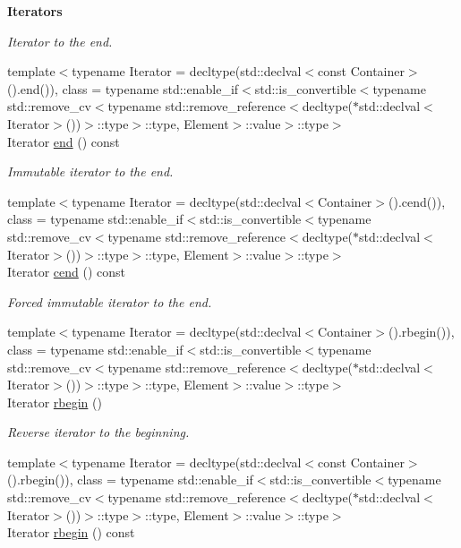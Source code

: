\begin{Indent}{\bf Iterators}
\begin{DoxyCompactItemize}
\begin{DoxyCompactList}\small\item\em Iterator to the end. \end{DoxyCompactList}\item 
{\footnotesize template$<$typename Iterator  = decltype(std\-::declval$<$const Container$>$().\-end()), class  = typename std\-::enable\-\_\-if$<$std\-::is\-\_\-convertible$<$typename std\-::remove\-\_\-cv$<$typename std\-::remove\-\_\-reference$<$decltype($\ast$std\-::declval$<$\-Iterator$>$())$>$\-::type$>$\-::type, Element$>$\-::value$>$\-::type$>$ }\\Iterator \hyperlink{exceptionmagrathea_1_1SimpleHyperOctree_a24c5fa04c7e0d320c952bf1cad21f171}{end} () const 
\begin{DoxyCompactList}\small\item\em Immutable iterator to the end. \end{DoxyCompactList}\item 
{\footnotesize template$<$typename Iterator  = decltype(std\-::declval$<$\-Container$>$().\-cend()), class  = typename std\-::enable\-\_\-if$<$std\-::is\-\_\-convertible$<$typename std\-::remove\-\_\-cv$<$typename std\-::remove\-\_\-reference$<$decltype($\ast$std\-::declval$<$\-Iterator$>$())$>$\-::type$>$\-::type, Element$>$\-::value$>$\-::type$>$ }\\Iterator \hyperlink{exceptionmagrathea_1_1SimpleHyperOctree_ab051bb22f6d7fb70f41cf3e849339794}{cend} () const 
\begin{DoxyCompactList}\small\item\em Forced immutable iterator to the end. \end{DoxyCompactList}\item 
{\footnotesize template$<$typename Iterator  = decltype(std\-::declval$<$\-Container$>$().\-rbegin()), class  = typename std\-::enable\-\_\-if$<$std\-::is\-\_\-convertible$<$typename std\-::remove\-\_\-cv$<$typename std\-::remove\-\_\-reference$<$decltype($\ast$std\-::declval$<$\-Iterator$>$())$>$\-::type$>$\-::type, Element$>$\-::value$>$\-::type$>$ }\\Iterator \hyperlink{exceptionmagrathea_1_1SimpleHyperOctree_ae3fa6fce9d0041e0801cc5a82b0e3d84}{rbegin} ()
\begin{DoxyCompactList}\small\item\em Reverse iterator to the beginning. \end{DoxyCompactList}\item 
{\footnotesize template$<$typename Iterator  = decltype(std\-::declval$<$const Container$>$().\-rbegin()), class  = typename std\-::enable\-\_\-if$<$std\-::is\-\_\-convertible$<$typename std\-::remove\-\_\-cv$<$typename std\-::remove\-\_\-reference$<$decltype($\ast$std\-::declval$<$\-Iterator$>$())$>$\-::type$>$\-::type, Element$>$\-::value$>$\-::type$>$ }\\Iterator \hyperlink{exceptionmagrathea_1_1SimpleHyperOctree_a3d35fe1c15b6276a760fea1c60d0ecf5}{rbegin} () const 

\end{DoxyCompactItemize}
\end{Indent}
